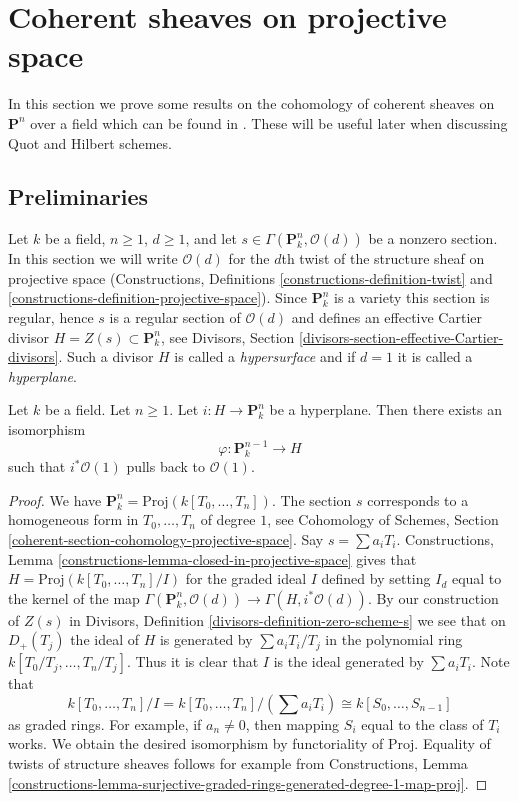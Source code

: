 \section{Coherent sheaves on projective space}
\label{section-coherent-Pn}

\noindent
In this section we prove some results on the cohomology of coherent
sheaves on $\mathbf{P}^n$ over a field which can be found in
\cite{Mum}. These will be useful later
when discussing Quot and Hilbert schemes.

\subsection{Preliminaries}
\label{subsection-preliminaries}

\noindent
Let $k$ be a field, $n \geq 1$, $d \geq 1$, and let
$s \in \Gamma(\mathbf{P}_k^n, \mathcal{O}(d))$
be a nonzero section. In this section we will write $\mathcal{O}(d)$
for the $d$th twist of the structure sheaf on projective space
(Constructions, Definitions \ref{constructions-definition-twist} and
\ref{constructions-definition-projective-space}).
Since $\mathbf{P}^n_k$ is a variety this section is regular, hence
$s$ is a regular section of $\mathcal{O}(d)$ and defines an effective
Cartier divisor $H = Z(s) \subset \mathbf{P}^n_k$, see
Divisors, Section \ref{divisors-section-effective-Cartier-divisors}.
Such a divisor $H$ is called a {\it hypersurface} and if $d = 1$
it is called a {\it hyperplane}.

\begin{lemma}
\label{lemma-hyperplane}
Let $k$ be a field. Let $n \geq 1$.
Let $i : H \to \mathbf{P}^n_k$ be a hyperplane.
Then there exists an isomorphism
$$
\varphi : \mathbf{P}^{n - 1}_k \longrightarrow H
$$
such that $i^*\mathcal{O}(1)$ pulls back to $\mathcal{O}(1)$.
\end{lemma}

\begin{proof}
We have $\mathbf{P}^n_k = \text{Proj}(k[T_0, \ldots, T_n])$.
The section $s$ corresponds to a homogeneous form in $T_0, \ldots, T_n$
of degree $1$, see
Cohomology of Schemes, Section
\ref{coherent-section-cohomology-projective-space}.
Say $s = \sum a_i T_i$.
Constructions, Lemma \ref{constructions-lemma-closed-in-projective-space}
gives that
$H = \text{Proj}(k[T_0, \ldots, T_n]/I)$ for the graded ideal $I$
defined by setting $I_d$ equal to the kernel of the map
$\Gamma(\mathbf{P}^n_k, \mathcal{O}(d)) \to \Gamma(H, i^*\mathcal{O}(d))$.
By our construction of $Z(s)$ in Divisors, 
Definition \ref{divisors-definition-zero-scheme-s}
we see that on $D_{+}(T_j)$ the ideal of $H$ is generated by
$\sum a_i T_i/T_j$ in the polynomial ring
$k[T_0/T_j, \ldots, T_n/T_j]$. Thus it is clear that $I$ is the ideal
generated by $\sum a_i T_i$. Note that
$$
k[T_0, \ldots, T_n]/I = k[T_0, \ldots, T_n]/(\sum a_i T_i) \cong
k[S_0, \ldots, S_{n - 1}]
$$
as graded rings. For example, if $a_n \not = 0$, then mapping
$S_i$ equal to the class of $T_i$ works. We obtain the desired isomorphism
by functoriality of $\text{Proj}$.
Equality of twists of structure sheaves follows for example from
Constructions, Lemma
\ref{constructions-lemma-surjective-graded-rings-generated-degree-1-map-proj}.
\end{proof}

